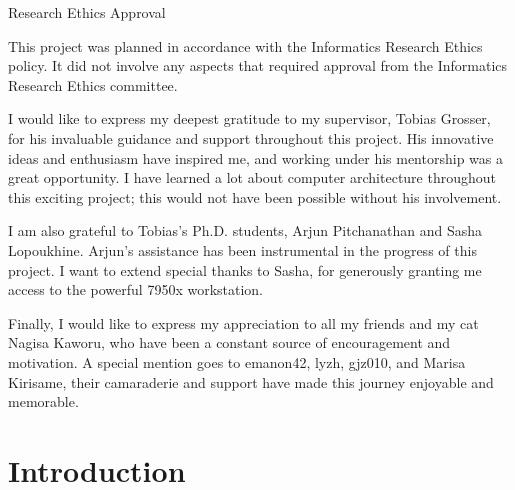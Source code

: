 \documentclass[logo,bsc,singlespacing,parskip]{infthesis}
\begin{document}
\begin{preliminary}
{}

\maketitle

\newenvironment{ethics}
   {\begin{frontenv}{Research Ethics Approval}{\LARGE}}
   {\end{frontenv}\newpage}

\begin{ethics}

This project was planned in accordance with the Informatics Research
Ethics policy. It did not involve any aspects that required approval
from the Informatics Research Ethics committee.

\standarddeclaration
\end{ethics}


\begin{acknowledgements}
    I would like to express my deepest gratitude to my supervisor, Tobias Grosser,
    for his invaluable guidance and support throughout this project. His
    innovative ideas and enthusiasm have inspired me, and working under his
    mentorship was a great opportunity. I have learned a lot about computer
    architecture throughout this exciting project; this would not have been
    possible without his involvement.

    I am also grateful to Tobias's Ph.D. students, Arjun Pitchanathan
    and Sasha Lopoukhine. Arjun's assistance has been instrumental
    in the progress of this project. I want to extend special thanks to
    Sasha, for generously granting me access to the powerful 7950x workstation.
    
    Finally, I would like to express my appreciation to all my friends and my
    cat Nagisa Kaworu, who have been a constant source of encouragement and
    motivation. A special mention goes to emanon42, lyzh, gjz010, and Marisa
    Kirisame, their camaraderie and support have made this journey enjoyable and
    memorable.

\end{acknowledgements}


\tableofcontents
\end{preliminary}


\chapter{Introduction}
\label{sec:introduction}
\end{document}
